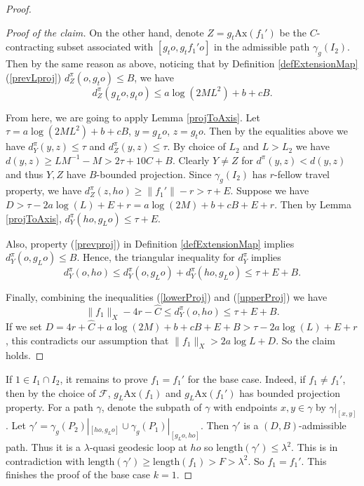 \documentclass{amsart}
\numberwithin{thm}{section}
\numberwithin{figure}{section}
\theoremstyle{definition}
\theoremstyle{definition}
\theoremstyle{remark}
\newcommand{\ax}{\mathrm{Ax}}
\numberwithin{equation}{section}
\theoremstyle{plain}
\begin{document}
\begin{proof}
\begin{proof}[Proof of the claim]
        On the other hand, denote $Z = g_t\ax(f_1')$ be the $C$-contracting subset associated with $[g_t o, g_t f_1' o]$ in the admissible path $\gamma_g(I_2)$. Then by the same reason as above, noticing that by Definition \ref{defExtensionMap}(\ref{prevLproj}) $d^\pi_Z (o, g_t o)\le B$, we have $$d^{\pi}_Z (g_L o, g_{t} o) \le a\log(2ML^2) + b + cB.$$
        
		From here, we are going to apply Lemma \ref{projToAxis}. Let $\tau = a\log(2ML^2) + b + cB$, $y = g_L o$, $z = g_t o$. Then by the equalities above we have $d^\pi_Y(y, z)\le \tau$ and $d^\pi_Z(y, z)\le \tau$. By choice of $L_2$ and $L > L_2$ we have $d(y, z) \ge LM^{-1} - M > 2\tau + 10C + B$. Clearly $Y\neq Z$ for $d^\pi(y, z) < d(y, z)$ and thus $Y, Z$ have $B$-bounded projection. Since $\gamma_g(I_2)$ has $r$-fellow travel property, we have $d^\pi_Z(z, h o) \ge \|f_1'\| - r > \tau + E$. Suppose we have $D > \tau - 2a\log(L) + E + r = a\log(2M) + b + cB + E + r$. Then by Lemma \ref{projToAxis}, $d^{\pi}_Y(h o, g_L o) \le \tau + E$.
        
	    Also, property (\ref{prevproj}) in Definition \ref{defExtensionMap} implies $d^{\pi}_Y (o, g_L o)\le B$. Hence, the triangular inequality for $d^{\pi}_Y$ implies 
		\begin{equation}\label{upperProj}
			d^{\pi}_Y(o, h o)\le d^{\pi}_Y(o, g_L o) + d^{\pi}_Y(h o, g_L o)\le \tau + E + B.
		\end{equation}
		
		Finally, combining the inequalities (\ref{lowerProj}) and (\ref{upperProj}) we have $$\|f_1\|_X - 4r - \hat C \le d^{\pi}_Y(o, h o) \le \tau + E + B.$$ If we set $D = 4r + \hat C + a \log (2 M) + b + cB + E + B > \tau - 2a\log(L) + E + r$, this contradicts our assumption that $\|f_1\|_X > 2a\log L + D$. So the claim holds.
	\end{proof}
	
	If $1\in I_1\cap I_2$, it remains to prove $f_1=f_1'$ for the base case.  Indeed, if  $f_1\neq f_1'$, then by the choice of $\mathcal{F}$, $g_L \ax(f_1)$ and $g_L \ax(f_1')$ has bounded projection property. For a path $\gamma$, denote the subpath of $\gamma$ with endpoints $x, y\in \gamma$ by $\gamma|_{[x, y]}$. Let $\gamma' = \gamma_g(P_2)|_{[h o, g_L o]} \cup \gamma_g(P_1)|_{[g_L o, h o]}$. Then $\gamma'$ is a $(D, B)$-admissible path. Thus it is a $\lambda$-quasi geodesic loop at $h o$ so $\mathrm{length}(\gamma') \le \lambda^2$. This is in contradiction with $\mathrm{length}(\gamma') \ge \mathrm{length}(f_1) > F > \lambda^2$. So $f_1 = f_1'$. This finishes the proof of the base case $k = 1$.
	

\end{proof}
\end{document}

